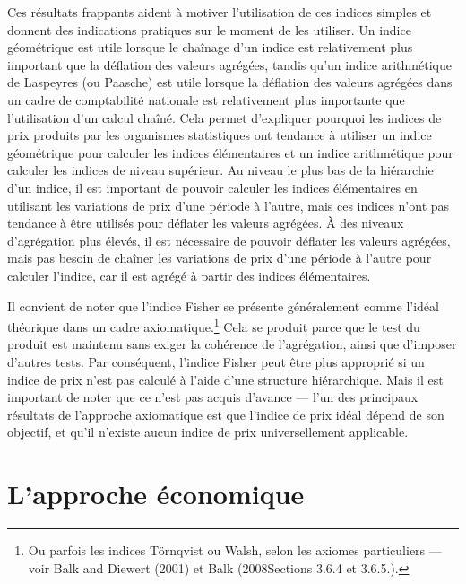 \documentclass[
]{article}
\begin{document}
Ces résultats frappants aident à motiver l'utilisation de ces indices simples et donnent des indications pratiques sur le moment de les utiliser. Un indice géométrique est utile lorsque le chaînage d'un indice est relativement plus important que la déflation des valeurs agrégées, tandis qu'un indice arithmétique de Laspeyres (ou Paasche) est utile lorsque la déflation des valeurs agrégées dans un cadre de comptabilité nationale est relativement plus importante que l'utilisation d'un calcul chaîné. Cela permet d'expliquer pourquoi les indices de prix produits par les organismes statistiques ont tendance à utiliser un indice géométrique pour calculer les indices élémentaires et un indice arithmétique pour calculer les indices de niveau supérieur. Au niveau le plus bas de la hiérarchie d'un indice, il est important de pouvoir calculer les indices élémentaires en utilisant les variations de prix d'une période à l'autre, mais ces indices n'ont pas tendance à être utilisés pour déflater les valeurs agrégées. À des niveaux d'agrégation plus élevés, il est nécessaire de pouvoir déflater les valeurs agrégées, mais pas besoin de chaîner les variations de prix d'une période à l'autre pour calculer l'indice, car il est agrégé à partir des indices élémentaires.

Il convient de noter que l'indice Fisher se présente généralement comme l'idéal théorique dans un cadre axiomatique.\footnote{Ou parfois les indices Törnqvist ou Walsh, selon les axiomes particuliers --- voir Balk and Diewert (2001) et Balk (2008Sections 3.6.4 et 3.6.5.).} Cela se produit parce que le test du produit est maintenu sans exiger la cohérence de l'agrégation, ainsi que d'imposer d'autres tests. Par conséquent, l'indice Fisher peut être plus approprié si un indice de prix n'est pas calculé à l'aide d'une structure hiérarchique. Mais il est important de noter que ce n'est pas acquis d'avance --- l'un des principaux résultats de l'approche axiomatique est que l'indice de prix idéal dépend de son objectif, et qu'il n'existe aucun indice de prix universellement applicable.

\hypertarget{lapproche-uxe9conomique}{%
\section{L'approche économique}\label{lapproche-uxe9conomique}}
\end{document}
